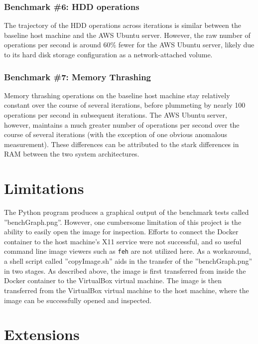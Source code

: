 \documentclass[sigconf]{acmart}
\begin{document}
\subsubsection{Benchmark \#6: HDD operations}

The trajectory of the HDD operations across iterations is similar between the baseline host machine and the AWS Ubuntu server. However, the raw number of operations per second is around 60\% fewer for the AWS Ubuntu server, likely due to its hard disk storage configuration as a network-attached volume.

\subsubsection{Benchmark \#7: Memory Thrashing}

Memory thrashing operations on the baseline host machine stay relatively constant over the course of several iterations, before plummeting by nearly 100 operations per second in subsequent iterations. The AWS Ubuntu server, however, maintains a much greater number of operations per second over the course of several iterations (with the exception of one obvious anomalous measurement). These differences can be attributed to the stark differences in RAM between the two system architectures.

\section{Limitations}

The Python program produces a graphical output of the benchmark tests called ''benchGraph.png''. However, one cumbersome limitation of this project is the ability to easily open the image for inspection. Efforts to connect the Docker container to the host machine's X11 service were not successful, and so useful command line image viewers such as {\tt feh} are not utilized here. As a workaround, a shell script called ''copyImage.sh'' aids in the transfer of the ''benchGraph.png'' in two stages. As described above, the image is first transferred from inside the Docker container to the VirtualBox virtual machine. The image is then transferred from the VirtualBox virtual machine to the host machine, where the image can be successfully opened and inspected. 

\section{Extensions}
\end{document}
